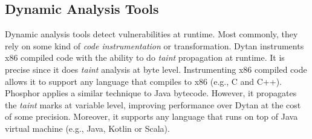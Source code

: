 \subsection{Dynamic Analysis Tools} 
Dynamic analysis tools detect vulnerabilities at runtime. Most commonly, they rely on some kind of \textit{code instrumentation} or transformation. Dytan \cite{dytan} instruments x86 compiled code with the ability to do \textit{taint} propagation at runtime. It is precise since it does \textit{taint} analysis at byte level. Instrumenting x86 compiled code allows it to support any language that compiles to x86 (e.g., C and C++). Phosphor \cite{phosphor} applies a similar technique to Java bytecode. However, it propagates the \textit{taint} marks at variable level, improving performance over Dytan at the cost of some precision. Moreover, it supports any language that runs on top of Java virtual machine (e.g., Java, Kotlin or Scala).

